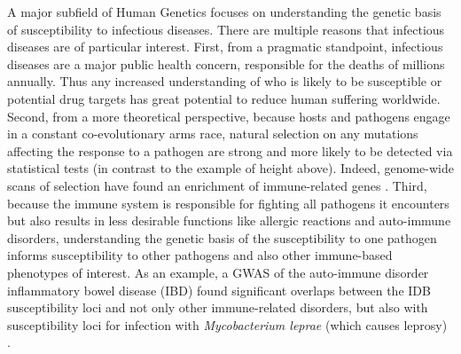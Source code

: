 A major subfield of Human Genetics focuses on understanding the
genetic basis of susceptibility to infectious diseases. There are
multiple reasons that infectious diseases are of particular
interest. First, from a pragmatic standpoint, infectious diseases are
a major public health concern, responsible for the deaths of millions
annually. Thus any increased understanding of who is likely to be
susceptible or potential drug targets has great potential to reduce
human suffering worldwide. Second, from a more theoretical
perspective, because hosts and pathogens engage in a constant
co-evolutionary arms race, natural selection on any mutations
affecting the response to a pathogen are strong and more likely to be
detected via statistical tests (in contrast to the example of height
above). Indeed, genome-wide scans of selection have found an
enrichment of immune-related genes \citep{Fumagalli2014}. Third,
because the immune system is responsible for fighting all pathogens it
encounters but also results in less desirable functions like allergic
reactions and auto-immune disorders, understanding the genetic basis
of the susceptibility to one pathogen informs susceptibility to other
pathogens and also other immune-based phenotypes of interest. As an
example, a GWAS of the auto-immune disorder inflammatory bowel disease
(IBD) found significant overlaps between the IDB susceptibility loci
and not only other immune-related disorders, but also with
susceptibility loci for infection with \emph{Mycobacterium leprae}
(which causes leprosy) \citep{Jostins2012}.
